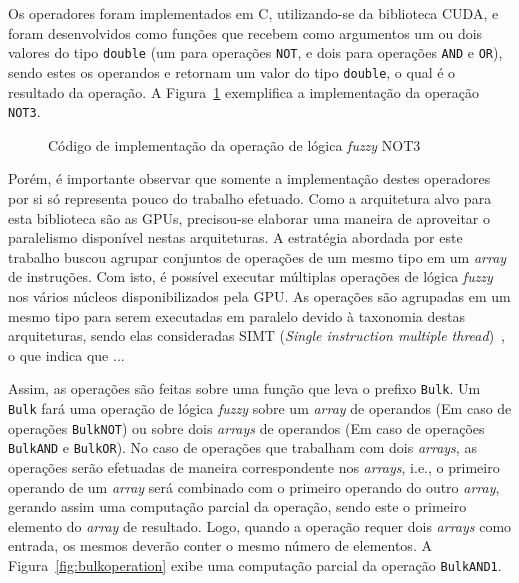 \documentclass[12pt]{article}
\begin{document}
{

Os operadores foram implementados em C, utilizando-se da biblioteca CUDA, e foram desenvolvidos como funções que recebem como argumentos um ou dois valores do tipo \texttt{double} (um para operações \texttt{NOT}, e dois para operações \texttt{AND} e \texttt{OR}), sendo estes os operandos e retornam um valor do tipo \texttt{double}, o qual é o resultado da operação. A Figura~\ref{fig:operation} exemplifica a implementação da operação \texttt{NOT3}.

\begin{figure}[!h]
\centering

\caption{Código de implementação da operação de lógica \textit{fuzzy} NOT3}
\label{fig:operation}
\end{figure}

Porém, é importante observar que somente a implementação destes operadores por si só representa pouco do trabalho efetuado. Como a arquitetura alvo para esta biblioteca são as GPUs, precisou-se elaborar uma maneira de aproveitar o paralelismo disponível nestas arquiteturas. A estratégia abordada por este trabalho buscou agrupar conjuntos de operações de um mesmo tipo em um \textit{array} de instruções. Com isto, é possível executar múltiplas operações de lógica \textit{fuzzy} nos vários núcleos disponibilizados pela GPU. As operações são agrupadas em um mesmo tipo para serem executadas em paralelo devido à taxonomia destas arquiteturas, sendo elas consideradas SIMT (\textit{Single instruction multiple thread})~\cite{keckler:11}, o que indica que ...

Assim, as operações são feitas sobre uma função que leva o prefixo \texttt{Bulk}. Um \texttt{Bulk} fará uma operação de lógica \textit{fuzzy} sobre um \textit{array} de operandos (Em caso de operações \texttt{BulkNOT}) ou sobre dois \textit{arrays} de operandos (Em caso de operações \texttt{BulkAND} e \texttt{BulkOR}). No caso de operações que trabalham com dois \textit{arrays}, as operações serão efetuadas de maneira correspondente nos \textit{arrays}, i.e., o primeiro operando de um \textit{array} será combinado com o primeiro operando do outro \textit{array}, gerando assim uma computação parcial da operação, sendo este o primeiro elemento do \textit{array} de resultado. Logo, quando a operação requer dois \textit{arrays} como entrada, os mesmos deverão conter o mesmo número de elementos. A Figura~\ref{fig:bulkoperation} exibe uma computação parcial da operação \texttt{BulkAND1}.

}
\end{document}
